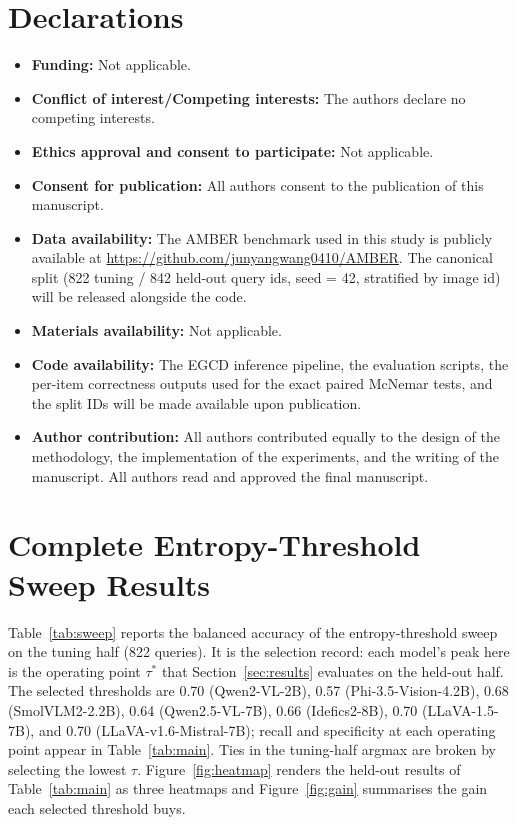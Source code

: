 \documentclass{ieeeaccess}
\begin{document}
\section*{Declarations}

\begin{itemize}
\item \textbf{Funding:} Not applicable.
\item \textbf{Conflict of interest/Competing interests:} The authors declare no competing interests.
\item \textbf{Ethics approval and consent to participate:} Not applicable.
\item \textbf{Consent for publication:} All authors consent to the publication of this manuscript.
\item \textbf{Data availability:} The AMBER benchmark used in this study is publicly available at \url{https://github.com/junyangwang0410/AMBER}. The canonical split (822 tuning / 842 held-out query ids, seed = 42, stratified by image id) will be released alongside the code.
\item \textbf{Materials availability:} Not applicable.
\item \textbf{Code availability:} The EGCD inference pipeline, the evaluation scripts, the per-item correctness outputs used for the exact paired McNemar tests, and the split IDs will be made available upon publication.
\item \textbf{Author contribution:} All authors contributed equally to the design of the methodology, the implementation of the experiments, and the writing of the manuscript. All authors read and approved the final manuscript.
\end{itemize}

\appendices
\section{Complete Entropy-Threshold Sweep Results}\label{app:sweep}

Table~\ref{tab:sweep} reports the balanced accuracy of the entropy-threshold sweep on the tuning half (822 queries). It is the selection record: each model's peak here is the operating point $\tau^{*}$ that Section~\ref{sec:results} evaluates on the held-out half. The selected thresholds are 0.70 (Qwen2-VL-2B), 0.57 (Phi-3.5-Vision-4.2B), 0.68 (SmolVLM2-2.2B), 0.64 (Qwen2.5-VL-7B), 0.66 (Idefics2-8B), 0.70 (LLaVA-1.5-7B), and 0.70 (LLaVA-v1.6-Mistral-7B); recall and specificity at each operating point appear in Table~\ref{tab:main}. Ties in the tuning-half argmax are broken by selecting the lowest $\tau$. Figure~\ref{fig:heatmap} renders the held-out results of Table~\ref{tab:main} as three heatmaps and Figure~\ref{fig:gain} summarises the gain each selected threshold buys.
\end{document}
